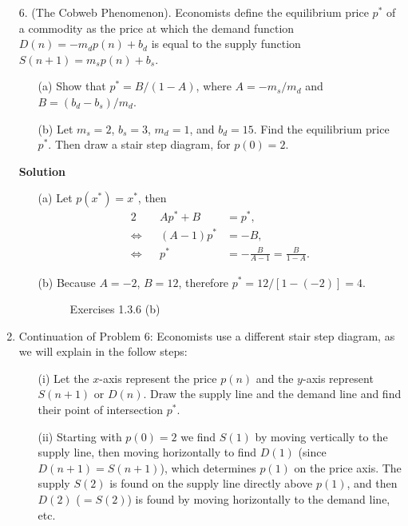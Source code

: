\begin{enumerate}
\begin{itemize}
        \end{itemize}
    \item[6.] (The Cobweb Phenomenon). Economists define the equilibrium price $p^*$ of a commodity as the price at which the demand function $D(n)=-m_dp(n)+b_d$ is equal to the supply function $S(n+1)=m_sp(n)+b_s$.
        \begin{itemize}
            \item[(a)] Show that $p^*=B/(1-A)$, where $A=-m_s/m_d$ and $B=(b_d-b_s)/m_d$.
            \item[(b)] Let $m_s=2$, $b_s=3$, $m_d=1$, and $b_d=15$. Find the equilibrium price $p^*$. Then draw a stair step diagram, for $p(0)=2$.
        \end{itemize}
        \textbf{Solution}
        \begin{itemize}
            \item[(a)] Let $p(x^*)=x^*$, then
                \begin{alignat*}{2}
                    && Ap^*+B & =p^*, \\
                    \Leftrightarrow && (A-1)p^* & =-B, \\
                    \Leftrightarrow && p^* & =-\frac{B}{A-1}=\frac{B}{1-A}.
                \end{alignat*}
            \item[(b)] Because $A=-2$, $B=12$, therefore $p^*=12/[1-(-2)]=4$.
                \begin{figure}[H]
                    \centering
                    \caption{Exercises 1.3.6 (b)}
                    \label{fig:exercises-1.3.6.b}
                \end{figure}
        \end{itemize}
    \setcounter{enumi}{6}
    \item Continuation of Problem 6:
        Economists use a different stair step diagram, as we will explain in the follow steps:
        \begin{itemize}
            \item[(i)] Let the $x$-axis represent the price $p(n)$ and the $y$-axis represent $S(n+1)$ or $D(n)$. Draw the supply line and the demand line and find their point of intersection $p^*$.
            \item[(ii)] Starting with $p(0)=2$ we find $S(1)$ by moving vertically to the supply line, then moving horizontally to find $D(1)$ (since $D(n+1)=S(n+1)$), which determines $p(1)$ on the price axis. The supply $S(2)$ is found on the supply line directly above $p(1)$, and then $D(2)$ ($=S(2)$) is found by moving horizontally to the demand line, etc.

\end{itemize}
\end{enumerate}
